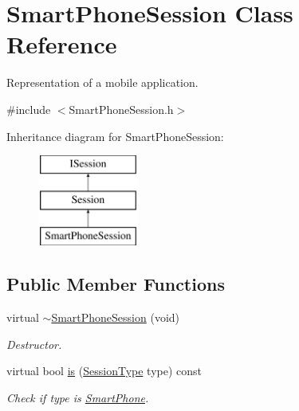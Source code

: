 \hypertarget{class_smart_phone_session}{\section{Smart\-Phone\-Session Class Reference}
\label{class_smart_phone_session}
}


Representation of a mobile application.  




{\ttfamily \#include $<$Smart\-Phone\-Session.\-h$>$}

Inheritance diagram for Smart\-Phone\-Session\-:\begin{figure}[H]
\begin{center}
\leavevmode
\includegraphics[height=3.000000cm]{class_smart_phone_session}
\end{center}
\end{figure}
\subsection*{Public Member Functions}
\begin{DoxyCompactItemize}
\item 
\hypertarget{class_smart_phone_session_a6d5e1555e09ed070829410935ca1f796}{virtual \hyperlink{class_smart_phone_session_a6d5e1555e09ed070829410935ca1f796}{$\sim$\-Smart\-Phone\-Session} (void)}\label{class_smart_phone_session_a6d5e1555e09ed070829410935ca1f796}

\begin{DoxyCompactList}\small\item\em Destructor. \end{DoxyCompactList}\item 
virtual bool \hyperlink{class_smart_phone_session_a26c68401114a1efe3f171f17c4cd2441}{is} (\hyperlink{class_i_session_a7989a93d03d8345d213a021d7444a32f}{Session\-Type} type) const 
\begin{DoxyCompactList}\small\item\em Check if type is \hyperlink{struct_smart_phone}{Smart\-Phone}. \end{DoxyCompactList}\end{DoxyCompactItemize}
